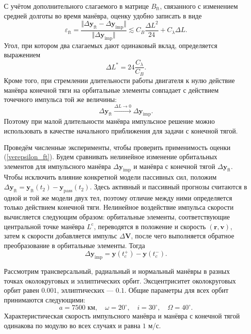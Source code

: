 С учётом дополнительного слагаемого в матрице $B_{\text{ft}}$, связанного с изменением средней долготы во время манёвра, оценку удобно записать в виде
\begin{equation}
    \varepsilon_{\text{ft}} = \frac{\Vert \Delta \mathbf{y}_{\text{ft}} - \Delta \mathbf{y}_{\text{imp}} \Vert}{\Vert \Delta \mathbf{y}_{\text{imp}} \Vert} \lesssim 
    C_{B} \frac{\Delta L^2}{24} + C_\lambda \Delta L.
\label{verepsilon_ft}
\end{equation}
Угол, при котором два слагаемых дают одинаковый вклад, определяется выражением
\begin{equation}
    \Delta L^* = 24 \frac{C_\lambda}{C_B}.
\end{equation}
Кроме того, при стремлении длительности работы двигателя к нулю действие манёвра конечной тяги на орбитальные элементы совпадает с действием точечного импульса той же величины:
\begin{equation}
    \Delta \mathbf{y}_{\text{ft}} 
    \xrightarrow{\Delta L \rightarrow 0} 
    \Delta \mathbf{y}_{\text{imp}}.
\end{equation}
Поэтому при малой длительности манёвра импульсное решение можно использовать в качестве начального приближения для задачи с конечной тягой.

Проведём численные эксперименты, чтобы проверить применимость оценки (\ref{verepsilon_ft}). Будем сравнивать нелинейное изменение орбитальных элементов для импульсного манёвра $\Delta \mathbf{y}_{\text{imp}}$ и манёвра с конечной тягой $\Delta \mathbf{y}_{\text{ft}}$. Чтобы исключить влияние конкретной модели пассивных сил, положим $\Delta \mathbf{y}_{\text{ft}} = \mathbf{y}_{\text{ft}}(t_2) - \mathbf{y}_{\text{pass}}(t_2)$. Здесь активный и пассивный прогнозы считаются в одной и той же модели двух тел, поэтому отличие между ними определяется только действием конечной тяги. Нелинейное воздействие импульса скорости вычисляется следующим образом: орбитальные элементы, соответствующие центральной точке манёвра $L^\text{c}$, переводятся в положение и скорость $(\mathbf{r}, \mathbf{v})$, затем к скорости добавляется импульс $\Delta \mathbf{V}$, после чего выполняется обратное преобразование в орбитальные элементы. Тогда
\begin{equation}
    \Delta \mathbf{y}_{\text{imp}} = \mathbf{y}(t_c^{+}) - \mathbf{y}(t_c^{-}).
\end{equation}

Рассмотрим трансверсальный, радиальный и нормальный манёвры в разных точках околокруговых и эллиптических орбит. Эксцентриситет околокруговых орбит равен $0.001$, эллиптических --- $0.1$. Общие параметры для всех орбит принимаются следующими:
\begin{equation}
    a = 7500 \text{ км}, \quad
    \omega = 20^\circ, \quad
    i = 30^\circ, \quad
    \Omega = 40^\circ.
\end{equation}
Характеристическая скорость импульсного манёвра и манёвра с конечной тягой одинакова по модулю во всех случаях и равна $1$ м/с.

